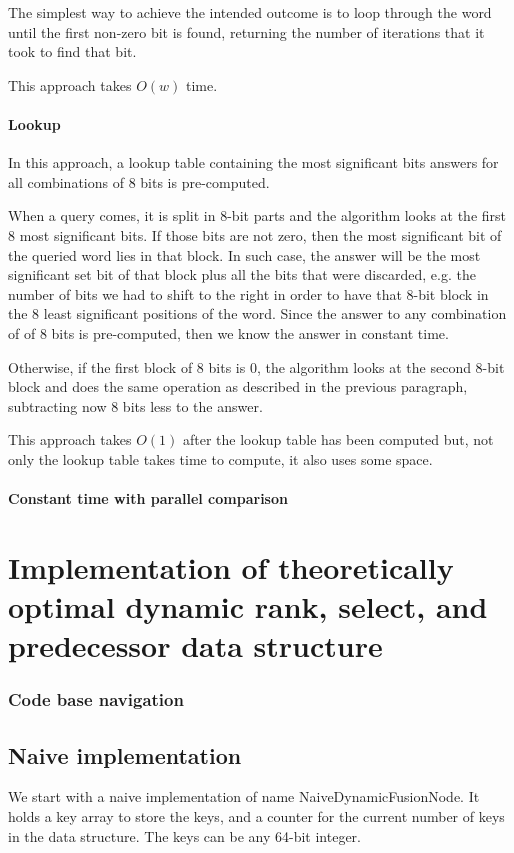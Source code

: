 The simplest way to achieve the intended outcome is to loop through the word until the first non-zero bit is found, returning the number of iterations that it took to find that bit.

This approach takes $O(w)$ time.

\subsubsection{Lookup}

In this approach, a lookup table containing the most significant bits answers for all combinations of 8 bits is pre-computed.

When a query comes, it is split in 8-bit parts and the algorithm looks at the first 8 most significant bits. If those bits are not zero, then the most significant bit of the queried word lies in that block. In such case, the answer will be the most significant set bit of that block plus all the bits that were discarded, e.g. the number of bits we had to shift to the right in order to have that 8-bit block in the 8 least significant positions of the word. Since the answer to any combination of of 8 bits is pre-computed, then we know the answer in constant time.

Otherwise, if the first block of 8 bits is 0, the algorithm looks at the second 8-bit block and does the same operation as described in the previous paragraph, subtracting now 8 bits less to the answer.

This approach takes $O(1)$ after the lookup table has been computed but, not only the lookup table takes time to compute, it also uses some space.

\subsubsection{Constant time with parallel comparison}



\chapter{Implementation of theoretically optimal dynamic rank, select, and predecessor data structure}

\subsection{Code base navigation}

\section{Naive implementation}
We start with a naive implementation of name {\ttfamily NaiveDynamicFusionNode}. It holds a {\ttfamily key} array to store the keys, and a counter for the current number of keys in the data structure. The keys can be any 64-bit integer.

